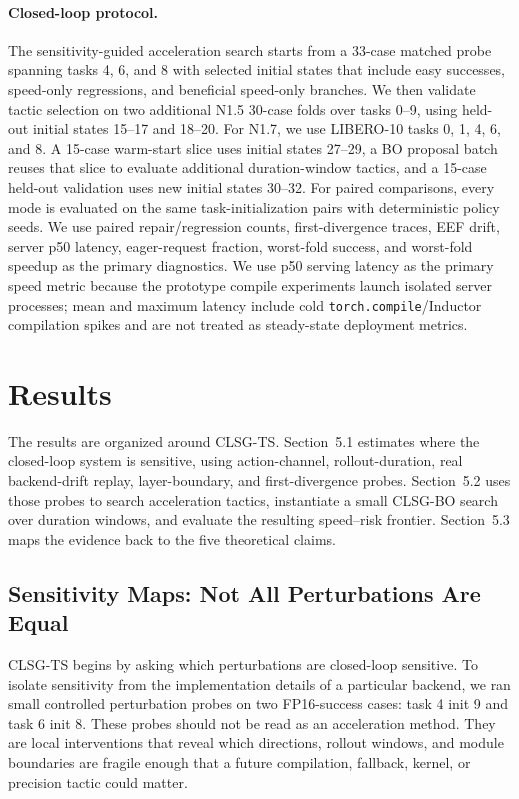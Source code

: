 \documentclass[10pt]{article}
\begin{document}
\paragraph{Closed-loop protocol.}
The sensitivity-guided acceleration search starts from a 33-case matched probe spanning tasks 4, 6, and 8 with selected initial states that include easy successes, speed-only regressions, and beneficial speed-only branches. We then validate tactic selection on two additional N1.5 30-case folds over tasks 0--9, using held-out initial states 15--17 and 18--20. For N1.7, we use LIBERO-10 tasks 0, 1, 4, 6, and 8. A 15-case warm-start slice uses initial states 27--29, a BO proposal batch reuses that slice to evaluate additional duration-window tactics, and a 15-case held-out validation uses new initial states 30--32. For paired comparisons, every mode is evaluated on the same task-initialization pairs with deterministic policy seeds. We use paired repair/regression counts, first-divergence traces, EEF drift, server p50 latency, eager-request fraction, worst-fold success, and worst-fold speedup as the primary diagnostics. We use p50 serving latency as the primary speed metric because the prototype compile experiments launch isolated server processes; mean and maximum latency include cold \texttt{torch.compile}/Inductor compilation spikes and are not treated as steady-state deployment metrics.

\section{Results}

The results are organized around CLSG-TS. Section~5.1 estimates where the closed-loop system is sensitive, using action-channel, rollout-duration, real backend-drift replay, layer-boundary, and first-divergence probes. Section~5.2 uses those probes to search acceleration tactics, instantiate a small CLSG-BO search over duration windows, and evaluate the resulting speed--risk frontier. Section~5.3 maps the evidence back to the five theoretical claims.

\subsection{Sensitivity Maps: Not All Perturbations Are Equal}

CLSG-TS begins by asking which perturbations are closed-loop sensitive. To isolate sensitivity from the implementation details of a particular backend, we ran small controlled perturbation probes on two FP16-success cases: task 4 init 9 and task 6 init 8. These probes should not be read as an acceleration method. They are local interventions that reveal which directions, rollout windows, and module boundaries are fragile enough that a future compilation, fallback, kernel, or precision tactic could matter.
\end{document}
